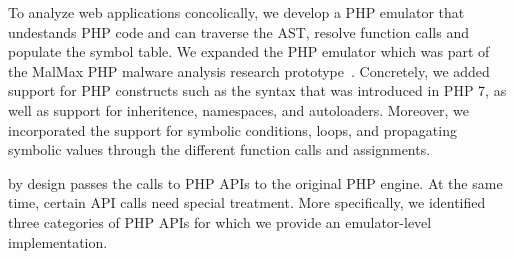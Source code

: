 To analyze web applications concolically, we develop a PHP emulator that undestands PHP code and can traverse the AST, resolve function calls and populate the symbol table. 
We expanded the PHP emulator which was part of the MalMax PHP malware analysis research prototype~\cite{naderi2019malmax}. 
Concretely, we added support for PHP constructs such as the syntax that was introduced in PHP 7, as well as support for inheritence, namespaces, and autoloaders. 
Moreover, we incorporated the support for symbolic conditions, loops, and propagating symbolic values through the different function calls and assignments. 

\sys{} by design passes the calls to PHP APIs to the original PHP engine. 
At the same time, certain API calls need special treatment. 
More specifically, we identified three categories of PHP APIs for which we provide an emulator-level implementation.



